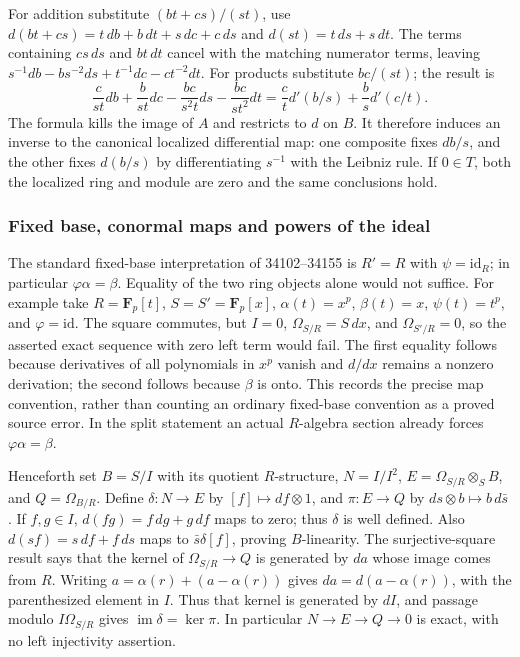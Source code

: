 For addition substitute \((bt+cs)/(st)\), use \(d(bt+cs)=t\,db+b\,dt+s\,dc+c\,ds\) and \(d(st)=t\,ds+s\,dt\). The terms containing \(cs\,ds\) and \(bt\,dt\) cancel with the matching numerator terms, leaving \(s^{-1}db-bs^{-2}ds+t^{-1}dc-ct^{-2}dt\). For products substitute \(bc/(st)\); the result is \[
\frac{c}{st}db+\frac{b}{st}dc-\frac{bc}{s^2t}ds-\frac{bc}{st^2}dt
=\frac ct d'(b/s)+\frac bs d'(c/t).
\] The formula kills the image of \(A\) and restricts to \(d\) on \(B\). It therefore induces an inverse to the canonical localized differential map: one composite fixes \(db/s\), and the other fixes \(d(b/s)\) by differentiating \(s^{-1}\) with the Leibniz rule. If \(0\in T\), both the localized ring and module are zero and the same conclusions hold.

\subsubsection{Fixed base, conormal maps and powers of the ideal}\label{algebra-proof-041-fixed-base-conormal-maps-and-powers-of-the-ideal}

The standard fixed-base interpretation of 34102--34155 is \(R'=R\) with \(\psi=\mathrm{id}_R\); in particular \(\varphi\alpha=\beta\). Equality of the two ring objects alone would not suffice. For example take \(R=\mathbf F_p[t]\), \(S=S'=\mathbf F_p[x]\), \(\alpha(t)=x^p\), \(\beta(t)=x\), \(\psi(t)=t^p\), and \(\varphi=\mathrm{id}\). The square commutes, but \(I=0\), \(\Omega_{S/R}=S\,dx\), and \(\Omega_{S'/R}=0\), so the asserted exact sequence with zero left term would fail. The first equality follows because derivatives of all polynomials in \(x^p\) vanish and \(d/dx\) remains a nonzero derivation; the second follows because \(\beta\) is onto. This records the precise map convention, rather than counting an ordinary fixed-base convention as a proved source error. In the split statement an actual \(R\)-algebra section already forces \(\varphi\alpha=\beta\).

Henceforth set \(B=S/I\) with its quotient \(R\)-structure, \(N=I/I^2\), \(E=\Omega_{S/R}\otimes_S B\), and \(Q=\Omega_{B/R}\). Define \(\delta:N\to E\) by \([f]\mapsto df\otimes1\), and \(\pi:E\to Q\) by \(ds\otimes b\mapsto b\,d\bar s\). If \(f,g\in I\), \(d(fg)=f\,dg+g\,df\) maps to zero; thus \(\delta\) is well defined. Also \(d(sf)=s\,df+f\,ds\) maps to \(\bar s\delta[f]\), proving \(B\)-linearity. The surjective-square result says that the kernel of \(\Omega_{S/R}\to Q\) is generated by \(da\) whose image comes from \(R\). Writing \(a=\alpha(r)+(a-\alpha(r))\) gives \(da=d(a-\alpha(r))\), with the parenthesized element in \(I\). Thus that kernel is generated by \(dI\), and passage modulo \(I\Omega_{S/R}\) gives \(\operatorname{im}\delta=\ker\pi\). In particular \(N\to E\to Q\to0\) is exact, with no left injectivity assertion.

